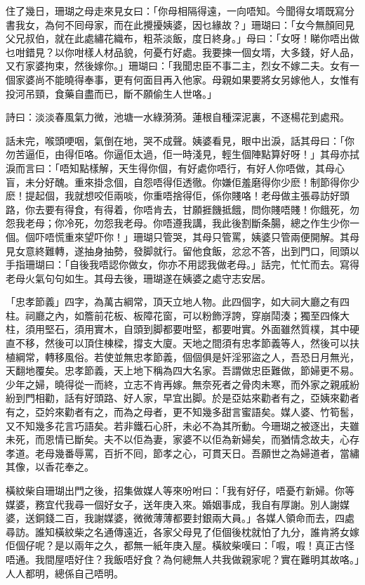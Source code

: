 \documentclass[a5paper, 12pt, openany]{book} %
\begin{document}
	住了幾日，珊瑚之母走來見女曰：「你母相隔得遠，一向唔知。今聞得女壻既寫分書我女，為何不囘母家，而在此攪擾姨婆，因乜緣故？」珊瑚曰：「女今無顏囘見父兄叔伯，就在此處繡花織布，粗茶淡飯，度日終身。」母曰：「女呀！睇你唔出做乜咁錯見？以你咁樣人材品貌，何憂冇好處。我要揀一個女壻，大多錢，好人品，又冇家婆拘束，然後嫁你。」珊瑚曰：「我聞忠臣不事二主，烈女不嫁二夫。女有一個家婆尚不能曉得奉事，更有何面目再入他家。母親如果要將女另嫁他人，女惟有投河吊頸，食藥自盡而已，斷不願偷生人世咯。」

	詩曰：淡淡春風氣力微，池塘一水綠漪漪。蓮根自種深泥裏，不逐楊花到處飛。

	話未完，喉頭哽咽，氣倒在地，哭不成聲。姨婆看見，眼中出淚，話其母曰：「你勿苦逼佢，由得佢咯。你逼佢太過，佢一時淺見，輕生個陣點算好呀！」其母亦拭淚而言曰：「唔知點樣解，天生得你個，有好處你唔行，有好人你唔做，其母心盲，未分好醜。重來掛念個，自怨唔得佢透徹。你嫌佢羞磨得你少麽！制節得你少麽！提起個，我就想咬佢兩啖，你重唔捨得佢，係你賤咯！老母做主張尋訪好頭路，你去要有得食，有得着，你唔肯去，甘願捱饑抵餓，問你賤唔賤！你餓死，勿怨我老母；你冷死，勿怨我老母。你唔遵我講，我此後割斷条腸，總之作生少你一個。個吓唔慌重來望吓你！」珊瑚只管哭，其母只管罵，姨婆只管兩便開解。其母見女意終難轉，遂抽身抽勢，發脚就行。留他食飯，忿忿不答，出到門口，囘頭以手指珊瑚曰：「自後我唔認你做女，你亦不用認我做老母。」話完，忙忙而去。寫得老母火氣句句如生。其母去後，珊瑚遂在姨婆之處守志安居。

	「忠孝節義」四字，為萬古綱常，頂天立地人物。此四個字，如大祠大廳之有四柱。祠廳之內，如簷前花板、板障花窗，可以粉飾浮誇，穿崩鬦湊；獨至四條大柱，須用堅石，須用實木，自頭到脚都要咁堅，都要咁實。外面雖然質樸，其中硬直不移，然後可以頂住棟樑，撐支大廈。天地之間須有忠孝節義等人，然後可以扶植綱常，轉移風俗。若使並無忠孝節義，個個俱是奸淫邪盜之人，吾恐日月無光，天翻地覆矣。忠孝節義，天上地下稱為四大名家。吾謂做忠臣難做，節婦更不易。少年之婦，曉得從一而終，立志不肯再嫁。無奈死者之骨肉未寒，而外家之親戚紛紛到門相勸，話有好頭路、好人家，早宜出脚。於是亞姑來勸者有之，亞姨來勸者有之，亞妗來勸者有之，而為之母者，更不知幾多甜言蜜語矣。媒人婆、竹筍䯻，又不知幾多花言巧語矣。若非鐵石心肝，未必不為其所動。今珊瑚之被逐出，夫雖未死，而恩情已斷矣。夫不以佢為妻，家婆不以佢為新婦矣，而猶情念故夫，心存孝道。老母幾番辱罵，百折不囘，節孝之心，可貫天日。吾願世之為婦道者，當繡其像，以香花奉之。

	橫紋柴自珊瑚出門之後，招集做媒人等來吩咐曰：「我有好仔，唔憂冇新婦。你等媒婆，務宜代我尋一個好女子，送年庚入來。婚姻事成，我自有厚謝。別人謝媒婆，送銅錢二百，我謝媒婆，微微薄薄都要封銀兩大員。」各媒人領命而去，四處尋訪。誰知橫紋柴之名通傳遠近，各家父母見了佢個後枕就怕了九分，誰肯將女嫁佢個仔呢？是以兩年之久，都無一紙年庚入屋。橫紋柴嘆曰：「㗇，㗇！真正古怪唔通。我間屋唔好住？我飯唔好食？為何總無人共我做親家呢？實在難明其故咯。」人人都明，總係自己唔明。
\end{document}
